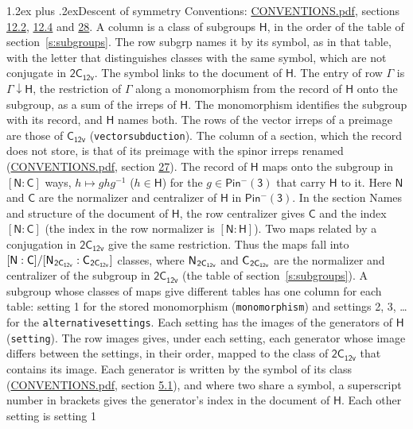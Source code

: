 \documentclass[10pt,a4paper]{article}
\makeatletter
\renewcommand\section{\@startsection{section}{1}{\z@}{-3ex plus -1ex minus -.2ex}%
  {1.2ex plus .2ex}{\normalfont\large\sffamily\bfseries\color{parttitle}}}
\numberwithin{equation}{section}
\newcommand{\grp}[1]{\mathsf{#1}}
\newcommand{\grpindex}[2]{[#1 : #2]}
\newcommand{\restr}[2]{#1\!\downarrow#2}
\newcommand{\hairsp}{\mkern1mu}
\makeatother
\begin{document}
\section{Descent of symmetry}\label{s:subduction}
Conventions: \href{../../CONVENTIONS.pdf}{CONVENTIONS.pdf}, sections \href{../../../rotation/CONVENTIONS.pdf\#conv.12.2}{12.2}, \href{../../../rotation/CONVENTIONS.pdf\#conv.12.4}{12.4} and \href{../../CONVENTIONS.pdf\#conv.28}{28}.
A column is a class of subgroups $\grp{H}$, in the order of the table of section~\ref{s:subgroups}. The row subgrp names it by its symbol, as in that table, with the letter that distinguishes classes with the same symbol, which are not conjugate in $\grp{2C_{12v}}$. The symbol links to the document of $\grp{H}$. The entry of row $\Gamma$ is $\restr{\Gamma}{\grp{H}}$, the restriction of $\Gamma$ along a monomorphism from the record of $\grp{H}$ onto the subgroup, as a sum of the irreps of $\grp{H}$. The monomorphism identifies the subgroup with its record, and $\grp{H}$ names both. The rows of the vector irreps of a preimage are those of \href{../../../rotation/data/pdf/C12v.pdf}{$\grp{C_{12v}}$} (\texttt{vectorsubduction}). The column of a section, which the record does not store, is that of its preimage with the spinor irreps renamed (\href{../../CONVENTIONS.pdf}{CONVENTIONS.pdf}, section \href{../../CONVENTIONS.pdf\#conv.27}{27}). \label{n:group.normalizer.o3}\label{n:group.centralizer.o3}\label{n:element.h}The record of $\grp{H}$ maps onto the subgroup in $\grpindex{\grp{N}}{\grp{C}}$ ways, $h \mapsto g h g^{-1}$ ($h \in \grp{H}$) for the $g \in \grp{Pin^{-}(3)}$ that carry $\grp{H}$ to it. Here $\grp{N}$ and $\grp{C}$ are the normalizer and centralizer of $\grp{H}$ in \href{Pinminus3.pdf}{$\grp{Pin^{-}(3)}$}. In the section Names and structure of the document of $\grp{H}$, the row centralizer gives $\grp{C}$ and the index $\grpindex{\grp{N}}{\grp{C}}$ (the index in the row normalizer is $\grpindex{\grp{N}}{\grp{H}}$). Two maps related by a conjugation in $\grp{2C_{12v}}$ give the same restriction. Thus the maps fall into $\grpindex{\grp{N}}{\grp{C}}/\grpindex{\grp{N}_{\hairsp \grp{2C_{12v}}}}{\grp{C}_{\hairsp \grp{2C_{12v}}}}$ classes, where $\grp{N}_{\hairsp \grp{2C_{12v}}}$ and $\grp{C}_{\hairsp \grp{2C_{12v}}}$ are the normalizer and centralizer of the subgroup in $\grp{2C_{12v}}$ (the table of section~\ref{s:subgroups}). \label{n:head.setting}A subgroup whose classes of maps give different tables has one column for each table: setting 1 for the stored monomorphism (\texttt{monomorphism}) and settings 2, 3, \dots{} for the \texttt{alternativesettings}. Each setting has the images of the generators of $\grp{H}$ (\texttt{setting}). \label{n:head.images}The row images gives, under each setting, each generator whose image differs between the settings, in their order, mapped to the class of $\grp{2C_{12v}}$ that contains its image. Each generator is written by the symbol of its class (\href{../../CONVENTIONS.pdf}{CONVENTIONS.pdf}, section \href{../../../rotation/CONVENTIONS.pdf\#conv.5.1}{5.1}), and where two share a symbol, a superscript number in brackets gives the generator's index in the document of $\grp{H}$. \label{n:irrep.Delta}Each other setting is setting 1 
\end{document}
